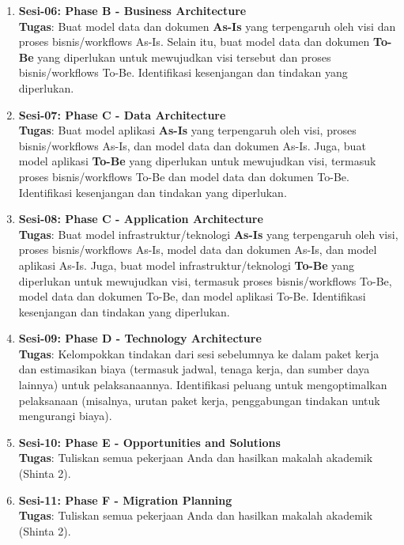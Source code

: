 \begin{enumerate}
	\item \textbf{Sesi-06: Phase B - Business Architecture} \\
	\textbf{Tugas}: Buat model data dan dokumen \textbf{As-Is} yang terpengaruh oleh visi dan proses bisnis/workflows As-Is. Selain itu, buat model data dan dokumen \textbf{To-Be} yang diperlukan untuk mewujudkan visi tersebut dan proses bisnis/workflows To-Be. Identifikasi kesenjangan dan tindakan yang diperlukan.
	
	\item \textbf{Sesi-07: Phase C - Data Architecture} \\
	\textbf{Tugas}: Buat model aplikasi \textbf{As-Is} yang terpengaruh oleh visi, proses bisnis/workflows As-Is, dan model data dan dokumen As-Is. Juga, buat model aplikasi \textbf{To-Be} yang diperlukan untuk mewujudkan visi, termasuk proses bisnis/workflows To-Be dan model data dan dokumen To-Be. Identifikasi kesenjangan dan tindakan yang diperlukan.
	
	\item \textbf{Sesi-08: Phase C - Application Architecture} \\
	\textbf{Tugas}: Buat model infrastruktur/teknologi \textbf{As-Is} yang terpengaruh oleh visi, proses bisnis/workflows As-Is, model data dan dokumen As-Is, dan model aplikasi As-Is. Juga, buat model infrastruktur/teknologi \textbf{To-Be} yang diperlukan untuk mewujudkan visi, termasuk proses bisnis/workflows To-Be, model data dan dokumen To-Be, dan model aplikasi To-Be. Identifikasi kesenjangan dan tindakan yang diperlukan.
	
	\item \textbf{Sesi-09: Phase D - Technology Architecture} \\
	\textbf{Tugas}: Kelompokkan tindakan dari sesi sebelumnya ke dalam paket kerja dan estimasikan biaya (termasuk jadwal, tenaga kerja, dan sumber daya lainnya) untuk pelaksanaannya. Identifikasi peluang untuk mengoptimalkan pelaksanaan (misalnya, urutan paket kerja, penggabungan tindakan untuk mengurangi biaya).
	
	\item \textbf{Sesi-10: Phase E - Opportunities and Solutions} \\
	\textbf{Tugas}: Tuliskan semua pekerjaan Anda dan hasilkan makalah akademik (Shinta 2).
	
	\item \textbf{Sesi-11: Phase F - Migration Planning} \\
	\textbf{Tugas}: Tuliskan semua pekerjaan Anda dan hasilkan makalah akademik (Shinta 2).
	

\end{enumerate}
